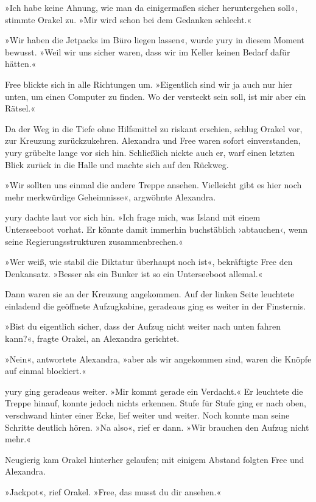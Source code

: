 »Ich habe keine Ahnung, wie man da einigermaßen sicher heruntergehen soll«, stimmte Orakel zu. »Mir wird schon bei dem Gedanken schlecht.«

»Wir haben die Jetpacks im Büro liegen lassen«, wurde yury in diesem Moment bewusst. »Weil wir uns sicher waren, dass wir im Keller keinen Bedarf dafür hätten.«

Free blickte sich in alle Richtungen um. »Eigentlich sind wir ja auch nur hier unten, um einen Computer zu finden. Wo der versteckt sein soll, ist mir aber ein Rätsel.«

Da der Weg in die Tiefe ohne Hilfsmittel zu riskant erschien, schlug Orakel vor, zur Kreuzung zurückzukehren. Alexandra und Free waren sofort einverstanden, yury grübelte lange vor sich hin. Schließlich nickte auch er, warf einen letzten Blick zurück in die Halle und machte sich auf den Rückweg.

»Wir sollten uns einmal die andere Treppe ansehen. Vielleicht gibt es hier noch mehr merkwürdige Geheimnisse«, argwöhnte Alexandra.

yury dachte laut vor sich hin. »Ich frage mich, was Island mit einem Unterseeboot vorhat. Er könnte damit immerhin buchstäblich ›abtauchen‹, wenn seine Regierungsstrukturen zusammenbrechen.«

»Wer weiß, wie stabil die Diktatur überhaupt noch ist«, bekräftigte Free den Denkansatz. »Besser als ein Bunker ist so ein Unterseeboot allemal.«

Dann waren sie an der Kreuzung angekommen. Auf der linken Seite leuchtete einladend die geöffnete Aufzugkabine, geradeaus ging es weiter in der Finsternis.

»Bist du eigentlich sicher, dass der Aufzug nicht weiter nach unten fahren kann?«, fragte Orakel, an Alexandra gerichtet.

»Nein«, antwortete Alexandra, »aber als wir angekommen sind, waren die Knöpfe auf einmal blockiert.«

yury ging geradeaus weiter. »Mir kommt gerade ein Verdacht.« Er leuchtete die Treppe hinauf, konnte jedoch nichts erkennen. Stufe für Stufe ging er nach oben, verschwand hinter einer Ecke, lief weiter und weiter. Noch konnte man seine Schritte deutlich hören. »Na also«, rief er dann. »Wir brauchen den Aufzug nicht mehr.«

Neugierig kam Orakel hinterher gelaufen; mit einigem Abstand folgten Free und Alexandra.

»Jackpot«, rief Orakel. »Free, das musst du dir ansehen.«

